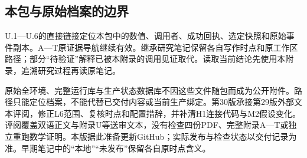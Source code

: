 \subsection[本包与原始档案的边界]{\texorpdfstring{\protect\hypertarget{u7}{}本包与原始档案的边界}{本包与原始档案的边界}}
U.1—U.6的直接链接定位本包中的数值、调用者、成功回执、选定快照和原始事件副本。A—T原证据导航继续有效。继承研究笔记保留各自写作时点和原工作区路径；部分“待验证”解释已被本附录的调用见证取代。读取当前结论先使用本附录，追溯研究过程再读原笔记。

原始全环境、完整运行库与生产状态数据库不因这些文件随包而成为公开附件。路径只能定位档案，不能代替已交付内容或当前生产绑定。第30版承接第29版外部文本评阅，修正L6范围、复核时点和配置措辞，并补清H1连接代码与M2假设变化。评阅覆盖双语正文与附录U等送审文本，没有检查四份PDF、完整附录A—T或独立重跑数学证明。本版据此准备更新GitHub；实际发布与检查状态以交付记录为准。早期笔记中的“本地”“未发布”保留各自原时点含义。

\n